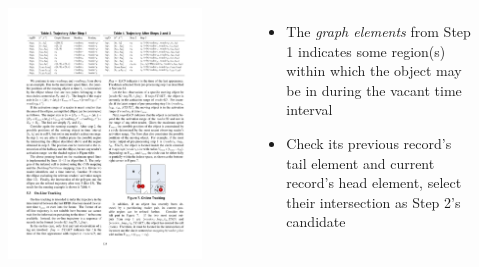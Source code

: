 \begin{frame}
\begin{columns}[c]
\begin{figure}[tb]
    \includegraphics[width=\columnwidth]{figures/2-1/2-1-11.pdf}
  \end{figure}


  \footnotesize{
    \begin{itemize}
      \item The \emph{graph elements} from Step 1 indicates some region(s) within which the object may be in during the vacant time interval
      \item Check its previous record's tail element and current record's head element, select their intersection as Step 2's candidate
    \end{itemize}
  }

\end{columns}

\end{frame}


